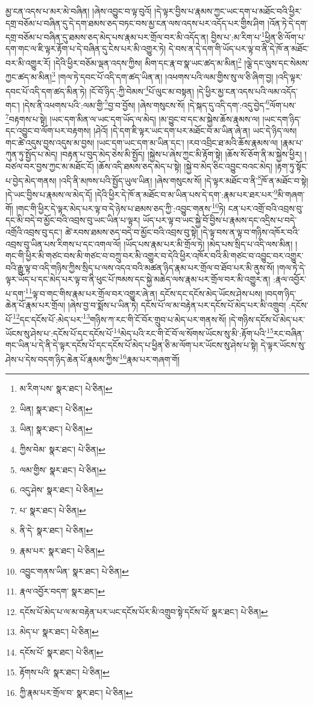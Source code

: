 མྱ་ངན་འདས་པ་མར་མེ་བཞིན། །ཞེས་འབྱུང་བ་ལྟ་བུའོ། །དེ་ལྟར་བྱིས་པ་རྣམས་ཀྱང་ཡང་དག་པ་མཐོང་བའི་ཕྱིར་དགྲ་བཅོམ་པ་བཞིན་དུ་དེ་དག་ཐམས་ཅད་བཏང་བས་མྱ་ངན་ལས་འདས་པར་འདོད་པར་གྱིས་ཤིག །འོན་ཏེ་དེ་དག་དགྲ་བཅོམ་པ་བཞིན་དུ་ཐམས་ཅད་མེད་པས་རྣམ་པར་གྲོལ་བར་མི་འདོད་ན། བྱིས་པ་:མ་རིག་པ་\footnote{མ་རིག་པས་  སྣར་ཐང་།  པེ་ཅིན། }ཕྱིན་ཅི་ལོག་པ་དག་གང་ལ་ཇི་ལྟར་རྟོག་པ་དེ་བཞིན་དུ་ངེས་པར་མི་འགྱུར་ཏེ། དེ་བས་ན་དེ་དག་གི་ཡོད་པར་ལྟ་བ་ནི་དེ་ཁོ་ན་མཐོང་བར་མི་འགྱུར་རོ། །དེའི་ཕྱིར་བཅོམ་ལྡན་འདས་ཀྱིས། མིག་དང་རྣ་བ་སྣ་ཡང་ཚད་མ་མིན།\footnote{ཡིན།  སྣར་ཐང་།  པེ་ཅིན། } །ལྕེ་དང་ལུས་དང་སེམས་ཀྱང་ཚད་མ་མིན།\footnote{ཡིན།  སྣར་ཐང་།  པེ་ཅིན། } །གལ་ཏེ་དབང་པོ་འདི་དག་ཚད་ཡིན་ན། །འཕགས་པའི་ལམ་གྱིས་སུ་ལ་ཅི་ཞིག་བྱ། །འདི་ལྟར་དབང་པོ་འདི་དག་ཚད་མིན་ཏེ། །ངོ་བོ་ཉིད་:ཀྱི་བེམས་\footnote{ཀྱིས་བེམ་  སྣར་ཐང་།  པེ་ཅིན། }པོ་ལུང་མ་བསྟན། །དེ་ཕྱིར་མྱ་ངན་འདས་པའི་ལམ་འདོད་གང་། །དེས་ནི་འཕགས་པའི་:ལམ་གྱི་\footnote{ལམ་གྱིས་  སྣར་ཐང་།  པེ་ཅིན། }བྱ་བ་བྱོས། །ཞེས་གསུངས་སོ། །དེ་སྐད་དུ་འདི་དག་:འདུ་བྱེད་\footnote{འདུ་ཤེས་  སྣར་ཐང་།  པེ་ཅིན། }ལོག་པས་\footnote{པ་  སྣར་ཐང་།  པེ་ཅིན། }བརྟགས་པ་སྟེ། །ཡང་དག་མིན་ལ་ཡང་དག་ཡོད་ལ་མེད། །མ་བྱུང་བ་དང་མ་སྐྱེས་ཆོས་རྣམས་ལ། །ཡང་དག་ཉིད་དང་འབྱུང་བ་ལོག་པར་བརྟགས། །ཤེའོ། །དེ་དག་ཇི་ལྟར་ཡང་དག་པར་མཐོང་བ་མ་ཡིན་ཞེ་ན། ཡང་དེ་ཉིད་ལས། གང་ཚེ་འདུས་བྱས་འདུས་མ་བྱས། །ཡང་དག་ཡང་དག་མ་ཡིན་དང་། །རབ་འབྲིང་ཐ་མའི་ཆོས་རྣམས་ལ། །རྣམ་པ་ཀུན་ཏུ་སྤྱོད་པ་མེད། །བརྟན་པ་བུད་མེད་ཅེས་མི་སྤྱོད། །སྐྱེས་པ་ཞེས་ཀྱང་མི་རྟོག་སྟེ། །ཆོས་སོ་ཅོག་ནི་མ་སྐྱེས་ཕྱིར། །བཙལ་བར་བྱས་ཀྱང་མ་མཐོང་ངོ། །ཆོས་འདི་ཐམས་ཅད་མེད་པ་སྟེ། །སྐྱེ་བ་མེད་ཅིང་འབྱུང་བའང་མེད། །རྟག་ཏུ་སྟོང་པ་བྱེད་མེད་གནས། །འདི་ནི་མཁས་པའི་སྤྱོད་ཡུལ་ཡིན། །ཞེས་གསུངས་སོ། །དེ་ལྟར་མཐོང་བ་ནི་\footnote{ནི་དེ་  སྣར་ཐང་།  པེ་ཅིན། }ཁོ་ན་མཐོང་བ་སྟེ། །དེ་ཡང་བྱིས་པ་རྣམས་ལ་མེད་དོ། །དེའི་ཕྱིར་དེ་ཁོ་ན་མཐོང་བ་མ་ཡིན་པས་དེ་དག་:རྣམ་པར་ཐར་པར་\footnote{རྣམ་པར་  སྣར་ཐང་།  པེ་ཅིན། }མི་གཞག་གོ། །གང་གི་ཕྱིར་དེ་ལྟར་མེད་པར་ལྟ་བ་དེ་ཉེས་པ་ཐམས་ཅད་ཀྱི་:འབྱུང་གནས་\footnote{འབྱུང་གནས་ཡིན་  སྣར་ཐང་།  པེ་ཅིན། }ཏེ། ངན་པར་འགྲོ་བའི་འབྲས་བུ་དང་མི་བདེ་བ་མྱོང་བའི་འབྲས་བུ་ཡང་ཡིན་པ་ལྟར། ཡོད་པར་ལྟ་བ་ཡང་སྐྱེ་བོ་བྱིས་པ་རྣམས་དང་འདྲིས་པ་བདེ་འགྲོའི་འབྲས་བུ་དང་། ཚེ་རབས་ཐམས་ཅད་བདེ་བ་མྱོང་བའི་འབྲས་བུ་སྟེ། །དེ་ལྟ་བས་ན་ལྟ་བ་གཉིས་འཁོར་བའི་འབྲས་བུ་ཡིན་པས་རིགས་པ་དང་འགལ་ལོ། །ཡོད་པས་རྣམ་པར་མི་གྲོལ་ཏེ། །མེད་པས་སྲིད་པ་འདི་ལས་མིན། །གང་གི་ཕྱིར་མི་གཙང་བས་མི་གཙང་བ་བཀྲུ་བར་མི་འགྱུར་བ་དེའི་ཕྱིར་འཁོར་བའི་མི་གཙང་བ་འབྱུང་བར་འགྱུར་བའི་རྒྱུ་ལྟ་བ་འདི་གཉིས་ཀྱིས་སྲིད་པ་ལས་འདའ་བའི་མཚན་ཉིད་རྣམ་པར་གྲོལ་བ་ཐོབ་པར་མི་ནུས་སོ། །གལ་ཏེ་དེ་ལྟར་ཡོད་པ་དང་མེད་པར་ལྟ་བ་ནི་ཕུང་པོ་ཁམས་དང་སྐྱེ་མཆེད་ལས་རྣམ་པར་གྲོལ་བར་མི་འགྱུར་ན། :རྣལ་འབྱོར་པ་དག་\footnote{རྣལ་འབྱོར་བདག་  སྣར་ཐང་། }ལྟ་བ་གང་གིས་རྣམ་པར་གྲོལ་བར་འགྱུར་ཞེ་ན། དངོས་དང་དངོས་མེད་ཡོངས་ཤེས་པས། །བདག་ཉིད་ཆེན་པོ་རྣམ་པར་གྲོལ། །ཞེས་བྱ་བ་སྨོས་པ་ཡིན་ཏེ། དངོས་པོ་ལ་མ་བརྟེན་པར་དངོས་པོ་མེད་པར་མི་འགྲུབ། :དངོས་པོ་\footnote{དངོས་པོ་མེད་པ་ལ་མ་བརྟེན་པར་ཡང་དངོས་པོར་མི་འགྲུབ་སྟེ་དངོས་པོ་  སྣར་ཐང་།  པེ་ཅིན། }དང་དངོས་པོ་:མེད་པར་\footnote{མེད་པ་  སྣར་ཐང་།  པེ་ཅིན། }གཉིས་ཀ་རང་གི་ངོ་བོར་གྲུབ་པ་མེད་པར་གནས་སོ། །དེ་གཉིས་དངོས་པོ་མེད་པར་ཡོངས་སུ་ཤེས་པ་:དངོས་པོ་དང་དངོས་པོ་\footnote{དངོས་པོ་  སྣར་ཐང་།  པེ་ཅིན། }མེད་པའི་རང་གི་ངོ་བོ་ལ་སོགས་ཡོངས་སུ་མི་:རྟོག་པའི་\footnote{རྟོགས་པའི་  སྣར་ཐང་།  པེ་ཅིན། }རང་བཞིན་གང་ཡིན་པ་དེ་ནི་དེ་ལྟར་དངོས་པོ་དང་དངོས་པོ་མེད་པ་ཕྱིན་ཅི་མ་ལོག་པར་ཡོངས་སུ་ཤེས་པ་སྟེ། དེ་ལྟར་ཡོངས་སུ་ཤེས་པ་དེས་བདག་ཉིད་ཆེན་པོ་རྣམས་ཀྱིས་\footnote{ཀྱི་རྣམ་པར་གྲོལ་བ་  སྣར་ཐང་།  པེ་ཅིན། }རྣམ་པར་གཞག་གོ། 